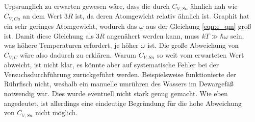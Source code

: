 Urpsrunglich zu erwarten gewesen wäre, dass die durch $C_{V,Sn}$ ähnlich nah wie $C_{V,Cu}$ an dem Wert $3R$ ist, da deren Atomgewicht
relativ ähnlich ist. Graphit hat ein sehr geringes Atomgewicht, wodurch das $\omega$ aus der Gleichung \ref{eqn:e_qm} groß ist.
Damit diese Gleichung als $3R$ angenähert werden kann, muss $k T \gg \hbar \omega$ sein, was höhere Temperaturen erfordert, je höher
$\omega$ ist. Die große Abweichung von $C_{V,C}$ wäre also dadurch zu erklären. Warum $C_{V,Sn}$ so weit vom erwarteten Wert abweicht,
ist nicht klar, es könnte aber auf systematische Fehler bei der Versuchsdurchführung zurückgeführt werden. Beispielsweise funktionierte
der Rührfisch nicht, weshalb ein manuelle umrühren des Wassers im Dewargefäß notwendig war. Dies wurde eventuell nicht stark genug 
gemacht. Wie eben angedeutet, ist allerdings eine eindeutige Begründung für die hohe Abweichung von $C_{V,Sn}$ nicht möglich.

